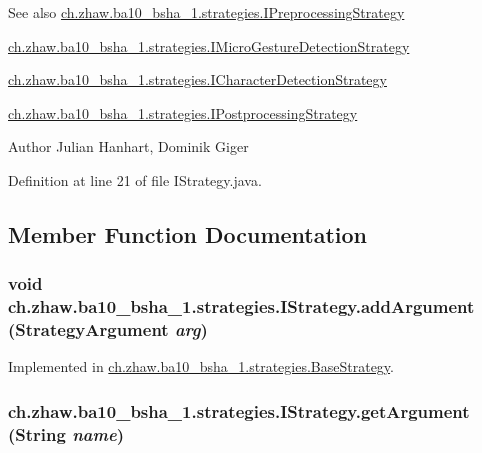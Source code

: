 \begin{DoxySeeAlso}{See also}
\hyperlink{interfacech_1_1zhaw_1_1ba10__bsha__1_1_1strategies_1_1IPreprocessingStrategy}{ch.zhaw.ba10\_\-bsha\_\-1.strategies.IPreprocessingStrategy} 

\hyperlink{interfacech_1_1zhaw_1_1ba10__bsha__1_1_1strategies_1_1IMicroGestureDetectionStrategy}{ch.zhaw.ba10\_\-bsha\_\-1.strategies.IMicroGestureDetectionStrategy} 

\hyperlink{interfacech_1_1zhaw_1_1ba10__bsha__1_1_1strategies_1_1ICharacterDetectionStrategy}{ch.zhaw.ba10\_\-bsha\_\-1.strategies.ICharacterDetectionStrategy} 

\hyperlink{interfacech_1_1zhaw_1_1ba10__bsha__1_1_1strategies_1_1IPostprocessingStrategy}{ch.zhaw.ba10\_\-bsha\_\-1.strategies.IPostprocessingStrategy}
\end{DoxySeeAlso}
\begin{DoxyAuthor}{Author}
Julian Hanhart, Dominik Giger 
\end{DoxyAuthor}


Definition at line 21 of file IStrategy.java.

\subsection{Member Function Documentation}
\hypertarget{interfacech_1_1zhaw_1_1ba10__bsha__1_1_1strategies_1_1IStrategy_a503733cf208ec99900463a36b2fea6b2}{
\subsubsection[{addArgument}]{\setlength{\rightskip}{0pt plus 5cm}void ch.zhaw.ba10\_\-bsha\_\-1.strategies.IStrategy.addArgument ({\bf StrategyArgument} {\em arg})}}
\label{interfacech_1_1zhaw_1_1ba10__bsha__1_1_1strategies_1_1IStrategy_a503733cf208ec99900463a36b2fea6b2}


Implemented in \hyperlink{classch_1_1zhaw_1_1ba10__bsha__1_1_1strategies_1_1BaseStrategy_ad106d9d501550fe475a4a01032632597}{ch.zhaw.ba10\_\-bsha\_\-1.strategies.BaseStrategy}.\hypertarget{interfacech_1_1zhaw_1_1ba10__bsha__1_1_1strategies_1_1IStrategy_acc7ef9593926bb88c142d296332525cc}{
\subsubsection[{getArgument}]{ ch.zhaw.ba10\_\-bsha\_\-1.strategies.IStrategy.getArgument (String {\em name})}}
\label{interfacech_1_1zhaw_1_1ba10__bsha__1_1_1strategies_1_1IStrategy_acc7ef9593926bb88c142d296332525cc}


